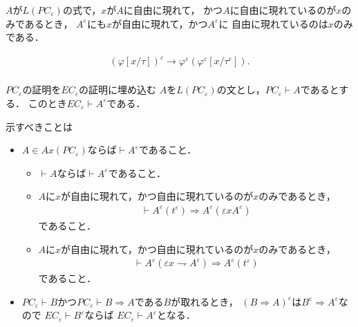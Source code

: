 	$A$が$L(PC_{\varepsilon})$の式で，$x$が$A$に自由に現れて，
	かつ$A$に自由に現れているのが$x$のみであるとき，
	$A^{\varepsilon}$にも$x$が自由に現れて，かつ$A^{\varepsilon}$に
	自由に現れているのは$x$のみである．
	
	\begin{align}
		(\varphi[x/\tau])^{\varepsilon} \rightarrow \varphi^{\varepsilon}
		(\varphi^{\varepsilon}[x/\tau^{\varepsilon}]). \\
	\end{align}
	
	\begin{itembox}[c]{$PC_{\varepsilon}$の証明を$EC_{\varepsilon}$の証明に埋め込む}
		$A$を$L(PC_{\varepsilon})$の文とし，$PC_{\varepsilon} \vdash A$であるとする．
		このとき$EC_{\varepsilon} \vdash A^{\varepsilon}$である．
	\end{itembox}
	
	示すべきことは
	\begin{itemize}
		\item $A \in Ax(PC_{\varepsilon})$ならば$\vdash A^{\varepsilon}$であること．
			\begin{itemize}
				\item $\vdash A$ならば$\vdash A^{\varepsilon}$であること．
				\item $A$に$x$が自由に現れて，かつ自由に現れているのが$x$のみであるとき，
					\begin{align}
						\vdash A^{\varepsilon}(t^{\varepsilon}) \Longrightarrow A^{\varepsilon}(\varepsilon x A^{\varepsilon})
					\end{align}
					であること．
				\item $A$に$x$が自由に現れて，かつ自由に現れているのが$x$のみであるとき，
					\begin{align}
						\vdash A^{\varepsilon}(\varepsilon x \rightharpoondown A^{\varepsilon}) \Longrightarrow A^{\varepsilon}(t^{\varepsilon})
					\end{align}
					であること．
			\end{itemize}
		
		\item $PC_{\varepsilon} \vdash B$かつ$PC_{\varepsilon} \vdash B \Longrightarrow A$である$B$が取れるとき，
			$(B \Longrightarrow A)^{\varepsilon}$は$B^{\varepsilon} \Longrightarrow A^{\varepsilon}$なので
			$EC_{\varepsilon} \vdash B^{\varepsilon}$ならば
			$EC_{\varepsilon} \vdash A^{\varepsilon}$となる．
	\end{itemize}

